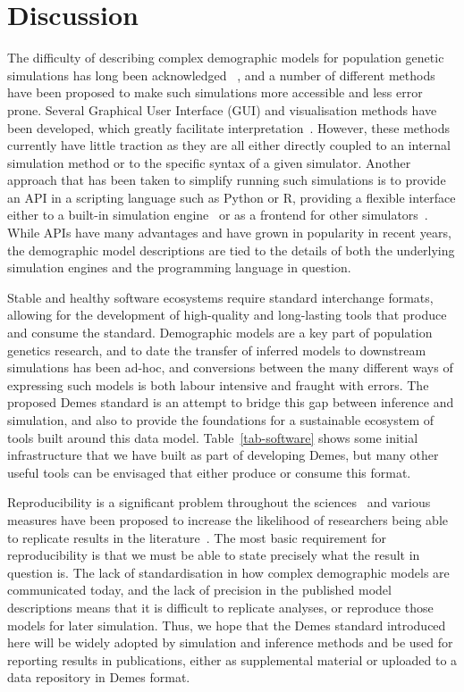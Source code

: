 \documentclass[11pt]{article}
\begin{document}
\section*{Discussion}

The difficulty of describing complex demographic models
for population genetic simulations has long been acknowledged
~\citep[][e.g.]{antao2007modeler4simcoal2}, %
and a number of different methods have been proposed to
make such simulations more accessible and less error prone.
Several Graphical User Interface (GUI) and visualisation
methods have been developed, which greatly facilitate
interpretation~\citep{mailund2005coasim,antao2007modeler4simcoal2,
ewing2010msms,zhou2018popdemog}. However, these methods
currently have little traction as they are all either directly coupled
to an internal simulation method or to the specific syntax
of a given simulator. Another approach that has been taken to
simplify running such simulations is to provide an API in a
scripting language such as Python or R, providing a flexible
interface either to a built-in simulation
engine~\citep{thornton2014cpp,kelleher2016efficient,haller2017flexible}
or as a frontend for other simulators~\citep{staab2016coala}.
While APIs have many advantages and have grown in popularity in
recent years, the demographic model descriptions are tied
to the details of both the underlying simulation engines
and the programming language in question.

Stable and healthy software ecosystems require standard interchange
formats, allowing for the development of high-quality and long-lasting
tools that produce and consume the standard.
Demographic models are a key part of population genetics research,
and to date the transfer of inferred models to downstream simulations
has been ad-hoc, and conversions between the many different ways
of expressing such models is both labour intensive and fraught with errors.
The proposed Demes standard is an attempt to bridge this gap
between inference and simulation, and also to provide the foundations
for a sustainable ecosystem of tools built around this data model.
Table~\ref{tab-software} shows some initial infrastructure that we have
built as part of developing Demes, but many other useful tools
can be envisaged that either produce or consume this format.

Reproducibility is a significant problem throughout the
sciences~\citep{baker20161} and various measures have been
proposed to increase the likelihood of researchers being
able to replicate results in the
literature~\citep{munafo2017manifesto}. The most basic requirement
for reproducibility is that we must be able to state precisely what
the result in question is. The lack of standardisation in how
complex demographic models are communicated today, and the lack of
precision in the published model descriptions means that it is difficult
to replicate analyses, or reproduce those models for later simulation.
Thus, we hope that the Demes standard introduced here will be widely adopted
by simulation and inference methods and be used for reporting results in
publications, either as supplemental material or uploaded to a data
repository in Demes format.



\end{document}
